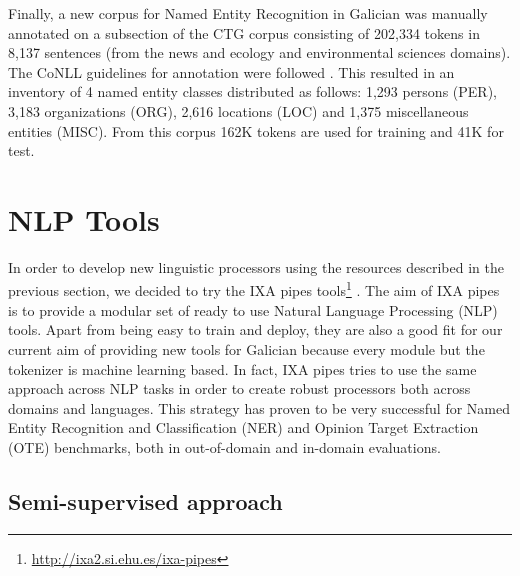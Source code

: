 \documentclass[10pt, a4paper]{article}
\begin{document}
Finally, a new corpus for Named Entity Recognition in Galician  was manually annotated on a subsection of the CTG corpus consisting of 202,334 tokens in 8,137 sentences (from the news and ecology and environmental sciences domains). The CoNLL guidelines for annotation were followed \cite{tjong_kim_sang_introduction_2003}. This resulted in an inventory of 4 named entity classes distributed as follows: 1,293 persons (PER), 3,183 organizations (ORG), 2,616 locations (LOC) and 1,375 miscellaneous entities (MISC). From this corpus 162K tokens are used for training and 41K for test.

\section{NLP Tools}\label{sec:processing-tools}

In order to develop new linguistic processors using the resources described in the previous section, we decided to try the IXA pipes tools\footnote{\url{http://ixa2.si.ehu.es/ixa-pipes}} \cite{ixa-pipeline}. The aim of IXA pipes is to provide a modular set of ready to use Natural Language Processing (NLP) tools. Apart from being easy to train and deploy, they are also a good fit for our current aim of providing new tools for Galician because every module but the tokenizer is machine learning based. In fact, IXA pipes tries to use the same approach across NLP tasks in order to create robust processors both across domains and languages. This strategy has proven to be very successful for Named Entity Recognition and Classification (NER) \cite{agerri2016robust} and Opinion Target Extraction (OTE) \cite{S15-2127} benchmarks, both in out-of-domain and in-domain evaluations.

\subsection{Semi-supervised approach}\label{sec:semi-superv-appr}
\end{document}
